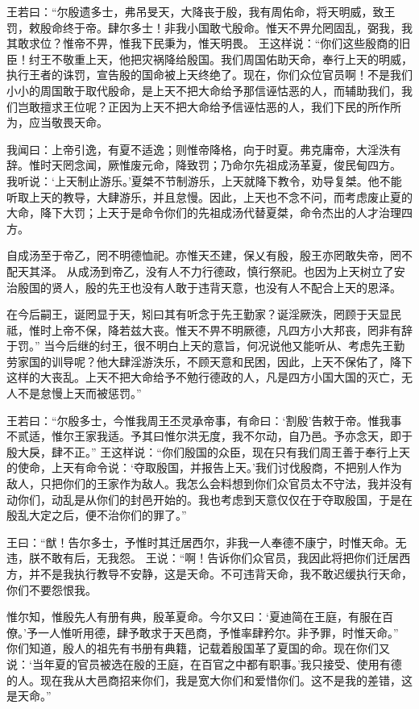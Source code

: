 \documentclass[a4paper,12pt,UTF8,twoside]{ctexbook}
\begin{document}
王若曰：“尔殷遗多士，弗吊旻天，大降丧于殷，我有周佑命，将天明威，致王罚，敕殷命终于帝。肆尔多士！非我小国敢弋殷命。惟天不畀允罔固乱，弼我，我其敢求位？惟帝不畀，惟我下民秉为，惟天明畏。
王这样说：“你们这些殷商的旧臣！纣王不敬重上天，他把灾祸降给殷国。我们周国佑助天命，奉行上天的明威，执行王者的诛罚，宣告殷的国命被上天终绝了。现在，你们众位官员啊！不是我们小小的周国敢于取代殷命，是上天不把大命给予那信诬怙恶的人，而辅助我们，我们岂敢擅求王位呢？正因为上天不把大命给予信诬怙恶的人，我们下民的所作所为，应当敬畏天命。

我闻曰：上帝引逸，有夏不适逸；则惟帝降格，向于时夏。弗克庸帝，大淫泆有辞。惟时天罔念闻，厥惟废元命，降致罚；乃命尔先祖成汤革夏，俊民甸四方。
我听说：‘上天制止游乐。’夏桀不节制游乐，上天就降下教令，劝导复桀。他不能听取上天的教导，大肆游乐，并且怠慢。因此，上天也不念不问，而考虑废止夏的大命，降下大罚；上天于是命令你们的先祖成汤代替夏桀，命令杰出的人才治理四方。

自成汤至于帝乙，罔不明德恤祀。亦惟天丕建，保乂有殷，殷王亦罔敢失帝，罔不配天其泽。
从成汤到帝乙，没有人不力行德政，慎行祭祀。也因为上天树立了安治殷国的贤人，殷的先王也没有人敢于违背天意，也没有人不配合上天的恩泽。

在今后嗣王，诞罔显于天，矧曰其有听念于先王勤家？诞淫厥泆，罔顾于天显民祗，惟时上帝不保，降若兹大丧。惟天不畀不明厥德，凡四方小大邦丧，罔非有辞于罚。”
当今后继的纣王，很不明白上天的意旨，何况说他又能听从、考虑先王勤劳家国的训导呢？他大肆淫游泆乐，不顾天意和民困，因此，上天不保佑了，降下这样的大丧乱。上天不把大命给予不勉行德政的人，凡是四方小国大国的灭亡，无人不是怠慢上天而被惩罚。”

王若曰：“尔殷多士，今惟我周王丕灵承帝事，有命曰：‘割殷’告敕于帝。惟我事不贰适，惟尔王家我适。予其曰惟尔洪无度，我不尔动，自乃邑。予亦念天，即于殷大戾，肆不正。”
王这样说：“你们殷国的众臣，现在只有我们周王善于奉行上天的使命，上天有命令说：‘夺取殷国，并报告上天。’我们讨伐殷商，不把别人作为敌人，只把你们的王家作为敌人。我怎么会料想到你们众官员太不守法，我并没有动你们，动乱是从你们的封邑开始的。我也考虑到天意仅仅在于夺取殷国，于是在殷乱大定之后，便不治你们的罪了。”

王曰：“猷！告尔多士，予惟时其迁居西尔，非我一人奉德不康宁，时惟天命。无违，朕不敢有后，无我怨。
王说：“啊！告诉你们众官员，我因此将把你们迁居西方，并不是我执行教导不安静，这是天命。不可违背天命，我不敢迟缓执行天命，你们不要怨恨我。

惟尔知，惟殷先人有册有典，殷革夏命。今尔又曰：‘夏迪简在王庭，有服在百僚。’予一人惟听用德，肆予敢求于天邑商，予惟率肆矜尔。非予罪，时惟天命。”
你们知道，殷人的祖先有书册有典籍，记载着殷国革了夏国的命。现在你们又说：‘当年夏的官员被选在殷的王庭，在百官之中都有职事。’我只接受、使用有德的人。现在我从大邑商招来你们，我是宽大你们和爱惜你们。这不是我的差错，这是天命。”
\end{document}
